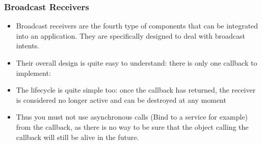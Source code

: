 \begin{frame}
  \frametitle{Broadcast Receivers}
  \begin{itemize}
  \item Broadcast receivers are the fourth type of components that can
    be integrated into an application. They are specifically designed
    to deal with broadcast intents.
  \item Their overall design is quite easy to understand: there is
    only one callback to implement: 
  \item The lifecycle is quite simple too: once the  callback
    has returned, the receiver is considered no longer active and can
    be destroyed at any moment
  \item Thus you must not use asynchronous calls (Bind to a service
    for example) from the  callback, as there is no way
    to be sure that the object calling the callback will still be alive
    in the future.
  \end{itemize}
\end{frame}
